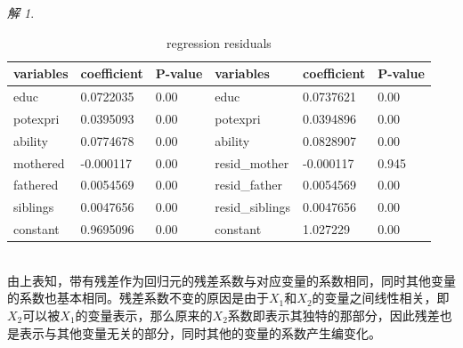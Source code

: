 \documentclass[a4paper]{ctexart}
\theoremstyle{remark}
\newtheorem*{solution}{解}
\begin{document}
\begin{itemize}
\begin{solution}
\begin{table}[h]
            \begin{tabular}{lll|lll}%
                \hline
                variables & coefficient & P-value & variables & coefficient & P-value\\
                \hline
                educ &  0.0722035  & 0.00 & educ &  0.0737621  & 0.00\\
                potexpri & 0.0395093  & 0.00 & potexpri &  0.0394896  & 0.00\\
                ability & 0.0774678 & 0.00 & ability &  0.0828907  & 0.00\\
                \hline
                mothered & -0.000117  & 0.00 & resid\_mother &  -0.000117  & 0.945\\
                fathered & 0.0054569  & 0.00 & resid\_father &  0.0054569  & 0.00\\
                siblings & 0.0047656 & 0.00 & resid\_siblings &  0.0047656  & 0.00\\
                constant & 0.9695096 & 0.00 & constant &  1.027229  & 0.00\\
                \hline
            \end{tabular} 
            \caption{\label{font-table} regression residuals} 
        \end{table}\\
        由上表知，带有残差作为回归元的残差系数与对应变量的系数相同，同时其他变量的系数也基本相同。残差系数不变的原因是由于$X_1$和$X_2$的变量之间线性相关，即$X_2$可以被$X_1$的变量表示，那么原来的$X_2$系数即表示其独特的那部分，因此残差也是表示与其他变量无关的部分，同时其他的变量的系数产生编变化。\\


\end{solution}
\end{itemize}
\end{document}
